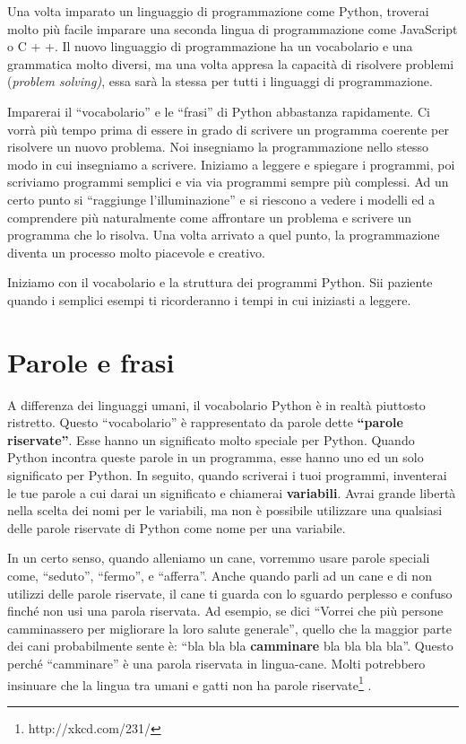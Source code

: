 Una volta imparato un linguaggio di programmazione come Python, troverai molto pi\`{u} facile imparare una seconda lingua di programmazione come JavaScript o C + +. Il nuovo linguaggio di programmazione ha un vocabolario e una grammatica molto diversi, ma una volta appresa la capacit\`{a} di risolvere problemi (\emph{problem solving)}, essa sar\`{a} la stessa per tutti i linguaggi di programmazione.

Imparerai il {``}vocabolario'' e le {``}frasi'' di Python abbastanza rapidamente. Ci vorr\`{a} pi\`{u} tempo prima di essere in grado di scrivere un programma coerente per risolvere un nuovo problema. Noi insegniamo la programmazione nello stesso modo in cui insegniamo a scrivere. Iniziamo a leggere e spiegare i programmi, poi scriviamo programmi semplici e via via programmi sempre pi\`{u} complessi. Ad un certo punto si {``}raggiunge l'illuminazione'' e si riescono a vedere i modelli ed a comprendere pi\`{u} naturalmente come affrontare un problema e scrivere un programma che lo risolva. Una volta arrivato a quel punto, la programmazione diventa un processo molto piacevole e creativo.

Iniziamo con il vocabolario e la struttura dei programmi Python. Sii paziente quando i semplici esempi ti ricorderanno i tempi in cui iniziasti a leggere.

\section{Parole e frasi}

A differenza dei linguaggi umani, il vocabolario Python \`{e} in realt\`{a} piuttosto ristretto. Questo {``}vocabolario'' \`{e} rappresentato da parole dette \textbf{{``}parole riservate''}. Esse hanno un significato molto speciale per Python. Quando Python incontra queste parole in un programma, esse hanno uno ed un solo significato per Python. In seguito, quando scriverai i tuoi programmi, inventerai le tue parole a cui darai un significato e chiamerai \textbf{variabili}. Avrai grande libert\`{a} nella scelta dei nomi per le variabili, ma non \`{e} possibile utilizzare una qualsiasi delle parole riservate di Python come nome per una variabile.


In un certo senso, quando alleniamo un cane, vorremmo usare parole speciali come, {``}seduto'', {``}fermo'', e {``}afferra''. Anche quando parli ad un cane e di non utilizzi delle parole riservate, il cane ti guarda con lo sguardo perplesso e confuso finch\'{e} non usi una parola riservata. Ad esempio, se dici {``}Vorrei che pi\`{u} persone camminassero per migliorare la loro salute generale'', quello che la maggior parte dei cani probabilmente sente \`{e}: {``}bla bla bla \textbf{camminare }bla bla bla bla''. Questo perch\'{e} {``}camminare'' \`{e} una parola riservata in lingua-cane. Molti potrebbero insinuare che la lingua tra umani e gatti non ha parole riservate\footnote{	 http://xkcd.com/231/} .


